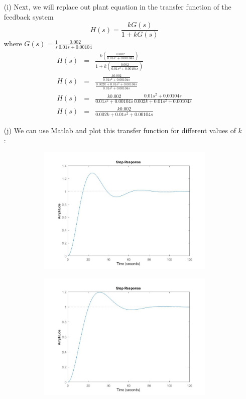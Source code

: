 \documentclass{article}
\begin{document}
\begin{itemize}
    \item[(i)] Next, we will replace out plant equation in the transfer function of the feedback system $$H(s) = \frac{kG(s)}{1+kG(s)}$$ where $G(s)=\frac{1}{s}\frac{0.002}{0.01s + 0.00104}$
    \begin{eqnarray}
        H(s) &=& \frac{k\left(\frac{0.002}{0.01s^2 + 0.00104s}\right)}{1+k\left(\frac{0.002}{0.01s^2 + 0.00104s}\right)}\\
        H(s) &=& \frac{\frac{k0.002}{0.01s^2 + 0.00104s}}{\frac{0.002k+0.01s^2 + 0.00104s}{0.01s^2 + 0.00104s}}\\
        H(s) &=& \frac{k0.002}{0.01s^2 + 0.00104s}\frac{0.01s^2 + 0.00104s}{0.002k+0.01s^2 + 0.00104s}\\
        H(s) &=& \frac{k0.002}{0.002k+0.01s^2 + 0.00104s}
    \end{eqnarray}
\item[(j)]We can use Matlab and plot this transfer function for different values of $k$ :
\begin{figure}[!htb]
\centering
\begin{subfigure}{.32\textwidth}
  \centering
  \includegraphics[width=0.9\linewidth]{k1.jpg}
\end{subfigure}
\begin{subfigure}{.32\textwidth}
  \centering
  \includegraphics[width=0.9\linewidth]{k064.jpg}

\end{subfigure}
\end{figure}
\end{itemize}
\end{document}
